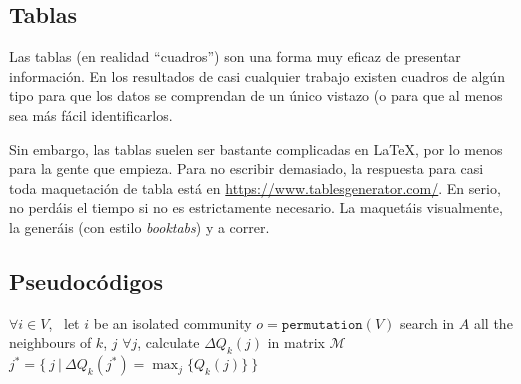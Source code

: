 \subsection{Tablas}

Las tablas (en realidad \enquote{cuadros}) son una forma muy eficaz de presentar información. En los resultados de casi cualquier trabajo existen cuadros de algún tipo para que los datos se comprendan de un único vistazo (o para que al menos sea más fácil identificarlos.


Sin embargo, las tablas suelen ser bastante complicadas en \LaTeX, por lo menos para la gente que empieza. Para no escribir demasiado, la respuesta para casi toda maquetación de tabla está en \href{https://www.tablesgenerator.com/}{https://www.tablesgenerator.com/}. En serio, no perdáis el tiempo si no es estrictamente necesario. La maquetáis visualmente, la generáis (con estilo \textit{booktabs}) y a correr.


\subsection{Pseudocódigos}


\begin{algorithm}
\begin{algorithmic}[1]
\STATE $\forall i \in V$, \ let $i$ be an isolated community
\STATE $o=\texttt{permutation}(V)$
\STATE search in $A$ all the neighbours of $k$, $j$
\STATE $\forall j$, calculate $\Delta Q_k(j)$ in matrix $\mathcal{M}$
\STATE $j^*=\{ \ j \ | \ \Delta Q_k(j^*)=\max_j\{Q_k(j)\} \ \}$
\ELSE
{}
\ENDIF
\ENDFOR
\end{algorithmic}\caption{\textit{Additional Louvain} \textbf{input}=$\left(A, \ \mathcal{M}\right)$ \textbf{output}=$P$}
\label{alg:AdditionalLouvain}
\end{algorithm}

